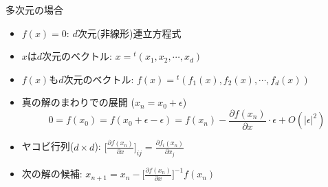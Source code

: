 \begin{frame}[t,fragile]{多次元の場合}
  \begin{itemize}
    \setlength{\itemsep}{1em}
  \item $f(x)=0$: $d$次元(非線形)連立方程式
  \item $x$は$d$次元のベクトル: $x = {}^t(x_1,x_2,\cdots,x_d)$
  \item $f(x)$も$d$次元のベクトル: $f(x) = {}^t(f_1(x), f_2(x),\cdots,f_d(x))$
  \item 真の解のまわりでの展開 ($x_n = x_0 + \epsilon$)
    \[
    0 = f(x_0) = f(x_0+\epsilon-\epsilon) = f(x_n) - \frac{\partial f(x_n)}{\partial x} \cdot \epsilon + O(|\epsilon|^2)
    \]
  \item ヤコビ行列($d\times d$): $\displaystyle \Big[\frac{\partial f(x_n)}{\partial x}\Big]_{ij} = \frac{\partial f_i(x_n)}{\partial x_j}$
  \item 次の解の候補: $\displaystyle x_{n+1} = x_n - \Big[\frac{\partial f(x_n)}{\partial x}\Big]^{-1} f(x_n)$
  \end{itemize}
\end{frame}
